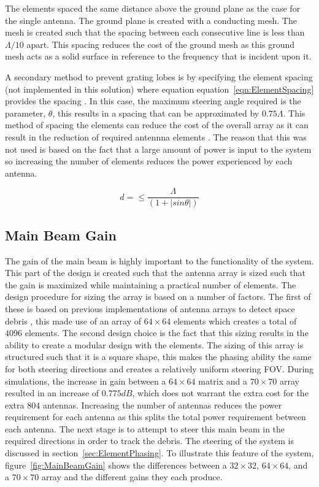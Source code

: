 \documentclass[11pt]{witseiepaper}
\begin{document}
The elements spaced the same distance above the ground plane as the case for the single antenna. The ground plane is created with a conducting mesh. The mesh is created such that the spacing between each consecutive line is less than $\Lambda/10$ apart. This spacing reduces the cost of the ground mesh as this ground mesh acts as a solid surface in reference to the frequency that is incident upon it.

A secondary method to prevent grating lobes is by specifying the element spacing (not implemented in this solution) where equation equation~\ref{eqn:ElementSpacing} provides the spacing \cite[p.~331]{radarHandbook}. In this case, the maximum steering angle required is the parameter, $\theta$, this results in a spacing that can be approximated by $0.75 \Lambda$. 
This method of spacing the elements can reduce the cost of the overall array as it can result in the reduction of required antennna elements \cite[p.~331]{radarHandbook}.
The reason that this was not used is based on the fact that a large amount of power is input to the system so increasing the number of elements reduces the power experienced by each antenna.

\begin{equation} \label{eqn:ElementSpacing}
d = \leq \frac{\Lambda}{(1 + | sin \theta |)}
\end{equation}


\subsection{Main Beam Gain} \label{sec:MainBeamGain}
The gain of the main beam is highly important to the functionality of the system. This part of the design is created such that the antenna array is sized such that the gain is maximized while maintaining a practical number of elements.
The design procedure for sizing the array is based on a number of factors. The first of these is based on previous implementations of antenna arrays to detect space debris \cite{AMISR}, this made use of an array of $64 \times 64$ elements which creates a total of $4096$ elements.
The second design choice is the fact that this sizing results in the ability to create a modular design with the elements. The sizing of this array is structured such that it is a square shape, this makes the phasing ability the same for both steering directions and creates a relatively uniform steering FOV.
During simulations, the increase in gain between a $64 \times 64$ matrix and a $70 \times 70$ array resulted in an increase of $0.775 dB$, which does not warrant the extra cost for the extra $804$ antennas.
Increasing the number of antennas reduces the power requirement for each antenna as this splits the total power requirement between each antenna.
The next stage is to attempt to steer this main beam in the required directions in order to track the debris. The steering of the system is discussed in section~\ref{sec:ElementPhasing}.
To illustrate this feature of the system, figure~\ref{fig:MainBeamGain} shows the differences between a $32 \times 32$, $64 \times 64$, and a $70 \times 70$ array and the different gains they each produce.
\end{document}
